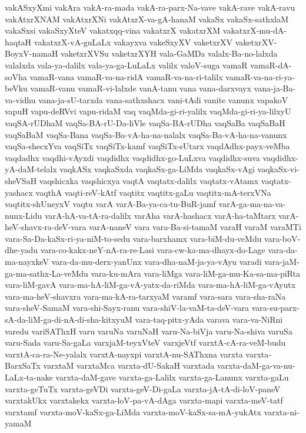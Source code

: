 {vakASxyXmi
vakAra
vakA-ra-mada
vakA-ra-parx-Na-vave
vakA-rave
vakA-ravu
vakAtxrXNAM
vakAtxrXNi
vakAtxrX-va-gA-hanaM
vakaSx
vakaSx-sathxlaM
vakaSxsi
vakaSxyXteV
vakatxqq-vina
vakatxrX
vakatxrXM
vakatxrX-mu-dA-haqtaH
vakatxrX-vA-guLaLx
vakayxva
vakeSxyXV
vaketxrXV
vaketxrXV-BoyxV-namaH
vaketxrXVSu
vaketxrXYH
vala-GaMDa
valalx-Ba-no-lalxda
valalxda
vala-ya-dalilx
vala-ya-ga-LuLaLx
valilx
valoV-suga
vamaR
vamaR-dA-soVha
vamaR-vana
vamaR-va-na-ridA
vamaR-va-na-ri-talilx
vamaR-va-na-ri-ya-beVku
vamaR-vanu
vamaR-vi-lalxde
vanA-tanu
vana
vana-darxvayx
vana-ja-Ba-va-vidhu
vana-ja-sU-tarxda
vana-sathxshacx
vani-tAdi
vanite
vanunx
vapakoV
vapuH
vapu-deRVvi
vapu-ridaM
vaq
vaqMda-gi-ri-yalilx
vaqMda-gi-ri-ya-lilxyU
vaqSA-rUDhaM
vaqSa-BA-rU-Da-liVle
vaqSa-BA-rUDha
vaqSaBa
vaqSaBaH
vaqSaBaM
vaqSa-Bana
vaqSa-Ba-vA-ha-na-nalalx
vaqSa-Ba-vA-ha-na-vanunx
vaqSa-shecxYva
vaqSiTx
vaqSiTx-kamf
vaqSiTx-sUtarx
vaqdAdhx-payx-veMba
vaqdadhx
vaqdhi-vAyxdi
vaqdidhx
vaqdidhx-go-LuLxva
vaqdidhx-suva
vaqdidhx-yA-daM-telalx
vaqkASx
vaqkaSxda
vaqkaSx-ga-LiMda
vaqkaSx-vAgi
vaqkaSx-vi-sheVSaH
vaqshicxka
vaqshicxya
vaqtA
vaqtatx-dalilx
vaqtatx-vAtamx
vaqtatx-yashacx
vaqthA
vaqti-reV-kAtf
vaqtitx
vaqtitx-gaLu
vaqtitx-mA-terxVNa
vaqtitx-shUneyxV
vaqtu
varA
varA-Ba-ya-ca-tu-BuR-jamf
varA-ga-ma-na-va-nunx-Lidu
varA-hA-va-tA-ra-dalilx
varAha
varA-hashacx
varA-ha-taMtarx
varA-heV-shavx-ra-deV-vara
varA-naneV
vara
vara-Ba-si-tamaM
varaH
varaM
varaMTi
vara-Sa-Da-kaSx-ri-ya-niM-to-sedu
vara-barxhamx
vara-biM-du-veMdu
vara-boV-dhe-yadu
vara-co-kakx-neY-nA-ra-re-Lasi
vara-cw-ka-ma-dhayx-do-Lage
vara-da-ma-nayxkeV
vara-da-mu-derx-yanUnx
vara-dha-naM-ja-ya-vAyu
varadi
vara-jaM-ga-ma-sathx-La-veMdu
vara-ku-mAra
vara-liMga
vara-liM-ga-mu-Ka-sa-ma-piRta
vara-liM-gavA
vara-ma-hA-liM-ga-vA-yatx-da-riMda
vara-ma-hA-liM-ga-vAyutx
vara-ma-heV-shavxra
vara-ma-kA-ra-tarxyaM
varamf
vara-sara
vara-sha-raNa
vara-sheV-SamaM
vara-shi-Sayx-ranu
vara-shiV-la-vaM-ta-deV-vara
vara-su-parx-sA-da-liM-ga-di-nA-di-sha-kitxyuM
vara-taq-pitx-yAda
varava
vara-va-NiRni
varedu
variSAThxH
varu
varuNa
varuNaH
varu-Na-biVja
varu-Na-shiva
varuSa
varu-Sada
varu-Sa-gaLa
varxjaM-teyxVteV
varxjeVtf
varxtA-cA-ra-veM-budu
varxtA-ca-ra-Ne-yalalx
varxtA-nayxpi
varxtA-nu-SAThxna
varxta
varxta-BarxSaTx
varxtaM
varxtaMca
varxta-dU-SakaH
varxtada
varxta-daM-ga-va-nu-LaLx-ta-nake
varxta-daM-gave
varxta-ga-Lalilx
varxta-ga-Lanunx
varxta-gaLu
varxta-geTuTx
varxta-geVDi
varxta-geV-Di-gaLa
varxta-jA-tA-di-loV-paneV
varxtakUkx
varxtakekx
varxta-loV-pa-vA-dAga
varxta-mapi
varxta-meV-tatf
varxtamf
varxta-moV-kaSx-ga-LiMda
varxta-moV-kaSx-sa-mA-yukAtx
varxta-ni-yamaM
}
